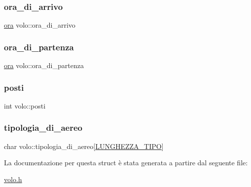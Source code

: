 \mbox{\label{structvolo_a013796dd7b5b4846ca0dab42dbee42af}} 
\subsubsection{\texorpdfstring{ora\+\_\+di\+\_\+arrivo}{ora\_di\_arrivo}}
{\footnotesize\ttfamily \hyperlink{structora}{ora} volo\+::ora\+\_\+di\+\_\+arrivo}

\mbox{\label{structvolo_a62eb1286c091b4b3cb45ac12f617f847}} 
\subsubsection{\texorpdfstring{ora\+\_\+di\+\_\+partenza}{ora\_di\_partenza}}
{\footnotesize\ttfamily \hyperlink{structora}{ora} volo\+::ora\+\_\+di\+\_\+partenza}

\mbox{\label{structvolo_a6c1db522301f7f750eedbf4455882030}} 
\subsubsection{\texorpdfstring{posti}{posti}}
{\footnotesize\ttfamily int volo\+::posti}

\mbox{\label{structvolo_aec6b08e749eba6c59301c1cd54f426d0}} 
\subsubsection{\texorpdfstring{tipologia\+\_\+di\+\_\+aereo}{tipologia\_di\_aereo}}
{\footnotesize\ttfamily char volo\+::tipologia\+\_\+di\+\_\+aereo\mbox{[}\hyperlink{costanti_8h_ada66e83c0e4395daca534ca22a09cede}{L\+U\+N\+G\+H\+E\+Z\+Z\+A\+\_\+\+T\+I\+PO}\mbox{]}}



La documentazione per questa struct è stata generata a partire dal seguente file\+:\begin{DoxyCompactItemize}
\item 
\hyperlink{volo_8h}{volo.\+h}\end{DoxyCompactItemize}
